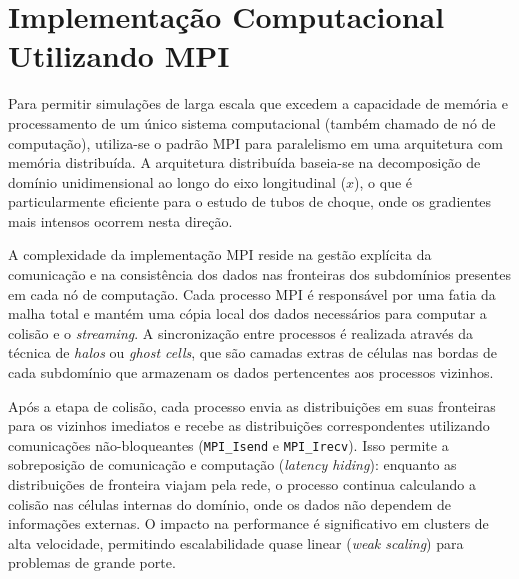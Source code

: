 \section{Implementação Computacional Utilizando MPI}\label{sec:implementacao-computacional-utilizando-mpi}

Para permitir simulações de larga escala que excedem a capacidade de memória e processamento de um único sistema computacional (também chamado de nó de computação), utiliza-se o padrão MPI para paralelismo em uma arquitetura com memória distribuída.
A arquitetura distribuída baseia-se na decomposição de domínio unidimensional ao longo do eixo longitudinal ($x$), o que é particularmente eficiente para o estudo de tubos de choque, onde os gradientes mais intensos ocorrem nesta direção.

A complexidade da implementação MPI reside na gestão explícita da comunicação e na consistência dos dados nas fronteiras dos subdomínios presentes em cada nó de computação.
Cada processo MPI é responsável por uma fatia da malha total e mantém uma cópia local dos dados necessários para computar a colisão e o \textit{streaming}.
A sincronização entre processos é realizada através da técnica de \textit{halos} ou \textit{ghost cells}, que são camadas extras de células nas bordas de cada subdomínio que armazenam os dados pertencentes aos processos vizinhos.

Após a etapa de colisão, cada processo envia as distribuições em suas fronteiras para os vizinhos imediatos e recebe as distribuições correspondentes utilizando comunicações não-bloqueantes (\texttt{MPI\_Isend} e \texttt{MPI\_Irecv}).
Isso permite a sobreposição de comunicação e computação (\textit{latency hiding}): enquanto as distribuições de fronteira viajam pela rede, o processo continua calculando a colisão nas células internas do domínio, onde os dados não dependem de informações externas.
O impacto na performance é significativo em clusters de alta velocidade, permitindo escalabilidade quase linear (\textit{weak scaling}) para problemas de grande porte.

